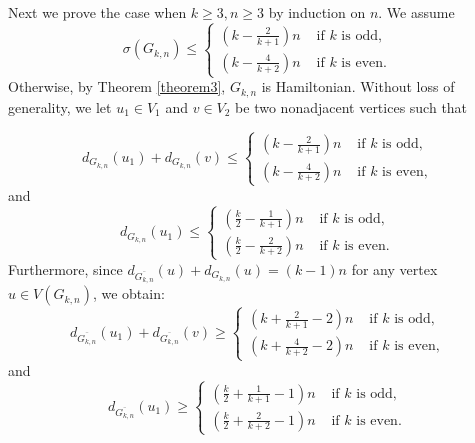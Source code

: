\documentclass[reqno]{amsart}
\begin{document}
Next we prove the case when $k \geq 3,n \geq 3$ by induction on $n$.  We assume $$\sigma(G_{k,n})\leq\left\{\begin{array}{ll}
  \left(k-\frac{2}{k+1}\right) n & \text { if } k \text { is odd, }  \\
  \left(k-\frac{4}{k+2}\right) n & \text { if } k \text { is even. }
 \end{array}\right.$$ Otherwise, by Theorem \ref{theorem3}, $G_{k,n}$ is Hamiltonian. Without loss of generality, we let $u_1 \in V_1$ and $v \in V_2$ be two nonadjacent vertices such that

 \begin{equation}\label{eq3}
 d_{G_{k,n}}(u_1)+d_{G_{k,n}}(v) \leq\left\{\begin{array}{ll}
  \left(k-\frac{2}{k+1}\right) n & \text { if } k \text { is odd, }  \\
  \left(k-\frac{4}{k+2}\right) n & \text { if } k \text { is even, }
 \end{array}\right.
\end{equation}
 and
  \begin{equation}\label{eq4}
 d_{G_{k,n}}(u_1) \leq\left\{\begin{array}{ll}
  \left(\frac{k}{2}-\frac{1}{k+1}\right) n & \text { if } k \text { is odd, }  \\
  \left(\frac{k}{2}-\frac{2}{k+2}\right) n & \text { if } k \text { is even. }
 \end{array}\right.
\end{equation}
Furthermore, since $d_{\overline{G_{k,n}}}(u)+d_{G_{k,n}}(u) =(k-1)n$ for any vertex $u\in V(G_{k,n})$,  we obtain:
 \begin{equation}\label{eq55}
 d_{\overline{G_{k,n}}}(u_1)+d_{\overline{G_{k,n}}}(v) \geq\left\{\begin{array}{ll}
  \left(k+\frac{2}{k+1}-2\right) n & \text { if } k \text { is odd, }  \\
  \left(k+\frac{4}{k+2}-2\right) n & \text { if } k \text { is even, }
 \end{array}\right.
\end{equation}
 and
  \begin{equation}\label{eq66}
 d_{\overline{G_{k,n}}}(u_1) \geq\left\{\begin{array}{ll}
  \left(\frac{k}{2}+\frac{1}{k+1}-1\right) n & \text { if } k \text { is odd, }  \\
  \left(\frac{k}{2}+\frac{2}{k+2}-1\right) n & \text { if } k \text { is even. }
 \end{array}\right.
\end{equation}
\end{document}
